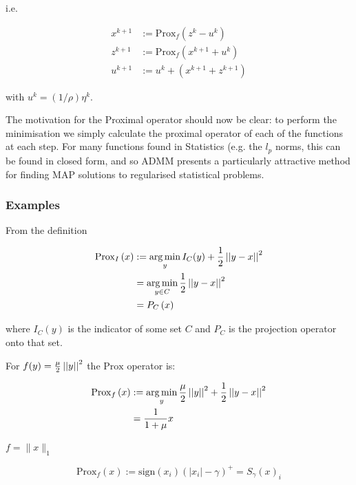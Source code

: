 \documentclass{article}
\begin{document}
i.e.

\begin{align}
x^{k+1} &:= \mathrm{Prox}_f \left( z^k - u^k\right)\\
z^{k+1} &:= \mathrm{Prox}_f \left(x^{k+1} + u^k\right)  \\
u^{k+1} &:= u^{k} + \left(x^{k+1} + z^{k+1}\right)
\end{align}

with \(u^k = \left(1/\rho\right) \eta^k\).

The motivation for the Proximal operator should now be clear: to perform the minimisation we simply calculate the proximal operator of each of the functions at each step. For many functions found in Statistics (e.g. the \(l_p\) norms, this can be found in closed form, and so ADMM presents a particularly attractive method for finding MAP solutions to regularised statistical problems.

\subsubsection{Examples}

\begin{example}[Indicator]
From the definition 

\begin{align}
\mathrm{Prox}_I\left(x\right) &:=  \operatorname*{arg\,min}_y I_C(y) + \frac{1}{2}\left|\left|y-x\right|\right|^2 \\
& = \operatorname*{arg\,min}_{y \in C} \frac{1}{2}\left|\left|y-x\right|\right|^2 \\
& = P_C\left(x\right)
\end{align}

where \(I_C(y)\) is the indicator of some set \(C\) and \(P_C\) is the projection operator onto that set.
\end{example} 

\begin{example}[\(l_2\) norm]
For \(f(y) = \frac{\mu}{2}\left|\left|y\right|\right|^2\) the \(\mathrm{Prox}\) operator is:

\begin{align}
\mathrm{Prox}_f\left(x\right) &:=  \operatorname*{arg\,min}_y \frac{\mu}{2}\left|\left|y\right|\right|^2 + \frac{1}{2}\left|\left|y-x\right|\right|^2 \\
& = \frac{1}{1+\mu}x
\end{align}
\end{example}

\begin{example}[\(l_1\) norm]
\(f = \|x\|_1\)

\begin{equation}
\mathrm{Prox}_f\left(x\right) := \mathrm{sign}(x_i)\left(|x_i| - \gamma\right)^+ = S_\gamma\left(x\right)_i 
\end{equation}
\end{example}
\end{document}
